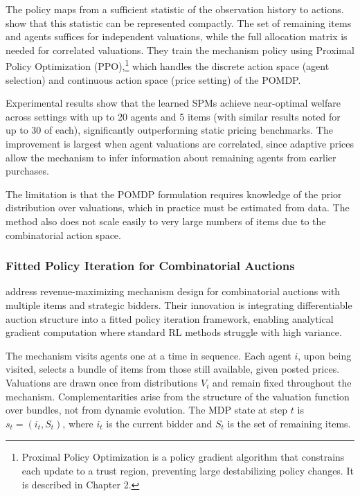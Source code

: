 The policy maps from a sufficient statistic of the observation history to actions. \citet{BreroEtAl2021} show that this statistic can be represented compactly. The set of remaining items and agents suffices for independent valuations, while the full allocation matrix is needed for correlated valuations. They train the mechanism policy using Proximal Policy Optimization (PPO),\footnote{Proximal Policy Optimization \citep{Schulman2017} is a policy gradient algorithm that constrains each update to a trust region, preventing large destabilizing policy changes. It is described in Chapter 2.} which handles the discrete action space (agent selection) and continuous action space (price setting) of the POMDP.

Experimental results show that the learned SPMs achieve near-optimal welfare across settings with up to 20 agents and 5 items (with similar results noted for up to 30 of each), significantly outperforming static pricing benchmarks. The improvement is largest when agent valuations are correlated, since adaptive prices allow the mechanism to infer information about remaining agents from earlier purchases.

The limitation is that the POMDP formulation requires knowledge of the prior distribution over valuations, which in practice must be estimated from data. The method also does not scale easily to very large numbers of items due to the combinatorial action space.


\subsubsection{Fitted Policy Iteration for Combinatorial Auctions}

\citet{RavindranathEtAl2024} address revenue-maximizing mechanism design for combinatorial auctions with multiple items and strategic bidders. Their innovation is integrating differentiable auction structure into a fitted policy iteration framework, enabling analytical gradient computation where standard RL methods struggle with high variance.

The mechanism visits agents one at a time in sequence. Each agent $i$, upon being visited, selects a bundle of items from those still available, given posted prices. Valuations are drawn once from distributions $V_i$ and remain fixed throughout the mechanism. Complementarities arise from the structure of the valuation function over bundles, not from dynamic evolution. The MDP state at step $t$ is $s_t = (i_t, S_t)$, where $i_t$ is the current bidder and $S_t$ is the set of remaining items.

